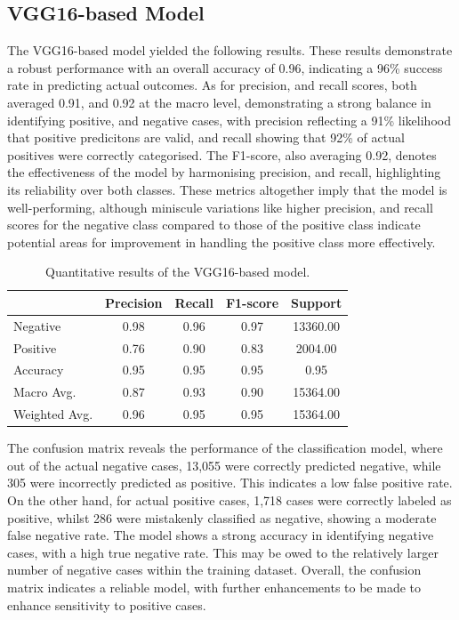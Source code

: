 \documentclass[../main]{subfiles}
\begin{document}
\clearpage

\subsection{VGG16-based Model}
The VGG16-based model yielded the following results. These results demonstrate a robust performance with an overall accuracy of 0.96, indicating a 96\% success rate in predicting actual outcomes. As for precision, and recall scores, both averaged 0.91, and 0.92 at the macro level, demonstrating a strong balance in identifying positive, and negative cases, with precision reflecting a 91\% likelihood that positive predicitons are valid, and recall showing that 92\% of actual positives were correctly categorised. The F1-score, also averaging 0.92, denotes the effectiveness of the model by harmonising precision, and recall, highlighting its reliability over both classes. These metrics altogether imply that the model is well-performing, although miniscule variations like higher precision, and recall scores for the negative class compared to those of the positive class indicate potential areas for improvement in handling the positive class more effectively.

\begin{table}[h!]
    \centering
    \begin{tabular}{|l|c|c|c|c|}
        \hline
         & Precision & Recall & F1-score & Support \\ \hline
        Negative & 0.98 & 0.96 & 0.97 & 13360.00 \\ \hline
        Positive & 0.76 & 0.90 & 0.83 & 2004.00 \\ \hline
        Accuracy & 0.95 & 0.95 & 0.95 & 0.95 \\ \hline
        Macro Avg. & 0.87 & 0.93 & 0.90 & 15364.00 \\ \hline
        Weighted Avg. & 0.96 & 0.95 & 0.95 & 15364.00 \\ \hline
    \end{tabular}
    \caption{Quantitative results of the VGG16-based model.}
    \label{tab:quantitative-results-vgg16}
\end{table}

\noindent The confusion matrix reveals the performance of the classification model, where out of the actual negative cases, 13,055 were correctly predicted negative, while 305 were incorrectly predicted as positive. This indicates a low false positive rate. On the other hand, for actual positive cases, 1,718 cases were correctly labeled as positive, whilst 286 were mistakenly classified as negative, showing a moderate false negative rate. The model shows a strong accuracy in identifying negative cases, with a high true negative rate. This may be owed to the relatively larger number of negative cases within the training dataset. Overall, the confusion matrix indicates a reliable model, with further enhancements to be made to enhance sensitivity to positive cases.
\end{document}
